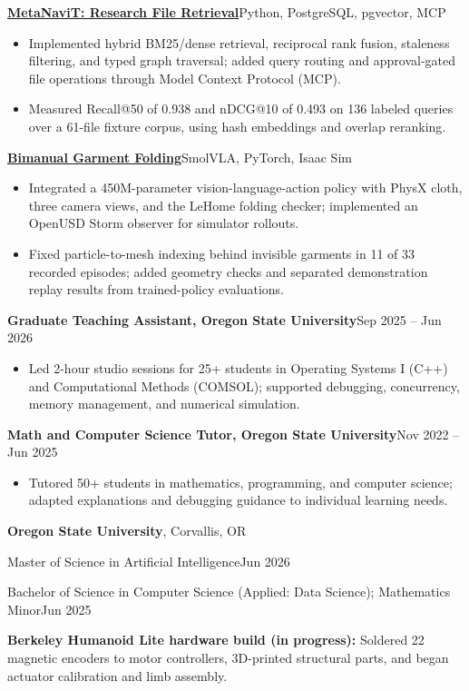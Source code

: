 \documentclass[letterpaper,10pt]{article}
\newcommand{\resumeSection}[1]{\par\vspace{7pt}{\large\bfseries #1}\par\vspace{3pt}}
\newcommand{\project}[3]{\par\vspace{3pt}\textbf{\href{#2}{#1}}\enspace\textbar\enspace #3\par}
\newcommand{\resumeItem}[1]{\item #1}
\begin{document}
\project{MetaNaviT: Research File Retrieval}{https://github.com/joses2017smjh/MetaNavT}{Python, PostgreSQL, pgvector, MCP}
\begin{itemize}
\resumeItem{Implemented hybrid BM25/dense retrieval, reciprocal rank fusion, staleness filtering, and typed graph traversal; added query routing and approval-gated file operations through Model Context Protocol (MCP).}
\resumeItem{Measured Recall@50 of 0.938 and nDCG@10 of 0.493 on 136 labeled queries over a 61-file fixture corpus, using hash embeddings and overlap reranking.}
\end{itemize}
\project{Bimanual Garment Folding}{https://github.com/joses2017smjh/IsaacSimFolding}{SmolVLA, PyTorch, Isaac Sim}
\begin{itemize}
\resumeItem{Integrated a 450M-parameter vision-language-action policy with PhysX cloth, three camera views, and the LeHome folding checker; implemented an OpenUSD Storm observer for simulator rollouts.}
\resumeItem{Fixed particle-to-mesh indexing behind invisible garments in 11 of 33 recorded episodes; added geometry checks and separated demonstration replay results from trained-policy evaluations.}
\end{itemize}
\resumeSection{Experience}
\textbf{Graduate Teaching Assistant, Oregon State University}\enspace\textbar\enspace Sep 2025 -- Jun 2026\par
\begin{itemize}
\resumeItem{Led 2-hour studio sessions for 25+ students in Operating Systems I (C++) and Computational Methods (COMSOL); supported debugging, concurrency, memory management, and numerical simulation.}
\end{itemize}
\textbf{Math and Computer Science Tutor, Oregon State University}\enspace\textbar\enspace Nov 2022 -- Jun 2025\par
\begin{itemize}
\resumeItem{Tutored 50+ students in mathematics, programming, and computer science; adapted explanations and debugging guidance to individual learning needs.}
\end{itemize}
\resumeSection{Education}
\textbf{Oregon State University}, Corvallis, OR\par
Master of Science in Artificial Intelligence\enspace\textbar\enspace Jun 2026\par
Bachelor of Science in Computer Science (Applied: Data Science); Mathematics Minor\enspace\textbar\enspace Jun 2025\par
\resumeSection{Additional Experience}
\textbf{Berkeley Humanoid Lite hardware build (in progress):} Soldered 22 magnetic encoders to motor controllers, 3D-printed structural parts, and began actuator calibration and limb assembly.
\end{document}

